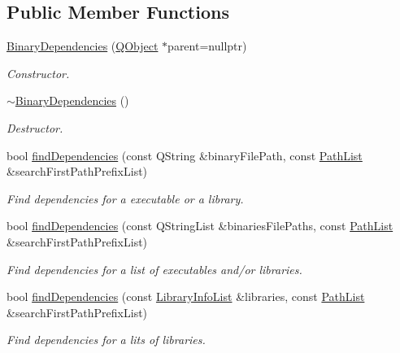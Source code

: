 \subsection*{Public Member Functions}
\begin{DoxyCompactItemize}
\item 
\hyperlink{class_mdt_1_1_deploy_utils_1_1_binary_dependencies_aa4decd7ce7db7292738f6d300445e6b0}{Binary\+Dependencies} (\hyperlink{class_q_object}{Q\+Object} $\ast$parent=nullptr)
\begin{DoxyCompactList}\small\item\em Constructor. \end{DoxyCompactList}\item 
\hyperlink{class_mdt_1_1_deploy_utils_1_1_binary_dependencies_a6bb36d0457ccd40462edb70cefc25bba}{$\sim$\+Binary\+Dependencies} ()
\begin{DoxyCompactList}\small\item\em Destructor. \end{DoxyCompactList}\item 
bool \hyperlink{class_mdt_1_1_deploy_utils_1_1_binary_dependencies_ab57081aeb3581d58f5677129ce564013}{find\+Dependencies} (const Q\+String \&binary\+File\+Path, const \hyperlink{class_mdt_1_1_deploy_utils_1_1_path_list}{Path\+List} \&search\+First\+Path\+Prefix\+List)
\begin{DoxyCompactList}\small\item\em Find dependencies for a executable or a library. \end{DoxyCompactList}\item 
bool \hyperlink{class_mdt_1_1_deploy_utils_1_1_binary_dependencies_a6b2116711ce9bbc3b3523eac16af28ec}{find\+Dependencies} (const Q\+String\+List \&binaries\+File\+Paths, const \hyperlink{class_mdt_1_1_deploy_utils_1_1_path_list}{Path\+List} \&search\+First\+Path\+Prefix\+List)
\begin{DoxyCompactList}\small\item\em Find dependencies for a list of executables and/or libraries. \end{DoxyCompactList}\item 
bool \hyperlink{class_mdt_1_1_deploy_utils_1_1_binary_dependencies_a99b12cd9e28d27d33d416a51e116f54e}{find\+Dependencies} (const \hyperlink{class_mdt_1_1_deploy_utils_1_1_library_info_list}{Library\+Info\+List} \&libraries, const \hyperlink{class_mdt_1_1_deploy_utils_1_1_path_list}{Path\+List} \&search\+First\+Path\+Prefix\+List)
\begin{DoxyCompactList}\small\item\em Find dependencies for a lits of libraries. \end{DoxyCompactList}\item 

\end{DoxyCompactItemize}
